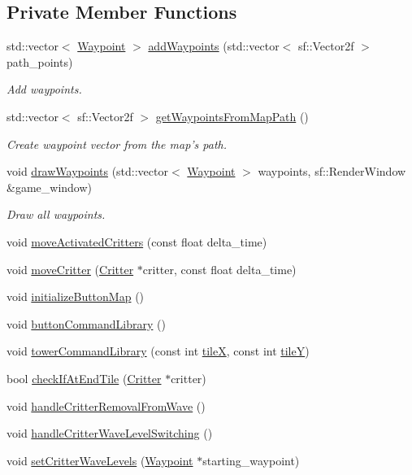 \subsection*{Private Member Functions}
\begin{DoxyCompactItemize}
\item 
std\+::vector$<$ \hyperlink{class_waypoint}{Waypoint} $>$ \hyperlink{class_game_state_play_aee1a80f02dd69d8f06c041020eb4447e}{add\+Waypoints} (std\+::vector$<$ sf\+::\+Vector2f $>$ path\+\_\+points)
\begin{DoxyCompactList}\small\item\em Add waypoints. \end{DoxyCompactList}\item 
std\+::vector$<$ sf\+::\+Vector2f $>$ \hyperlink{class_game_state_play_aae84ae33a68caa8bf05a4a2a49a2b41d}{get\+Waypoints\+From\+Map\+Path} ()
\begin{DoxyCompactList}\small\item\em Create waypoint vector from the map's path. \end{DoxyCompactList}\item 
void \hyperlink{class_game_state_play_a28fee46c0b9d0248ed319976be94494a}{draw\+Waypoints} (std\+::vector$<$ \hyperlink{class_waypoint}{Waypoint} $>$ waypoints, sf\+::\+Render\+Window \&game\+\_\+window)
\begin{DoxyCompactList}\small\item\em Draw all waypoints. \end{DoxyCompactList}\item 
void \hyperlink{class_game_state_play_ae812a7447027abe5fcc2f79bf3e35ad8}{move\+Activated\+Critters} (const float delta\+\_\+time)
\item 
void \hyperlink{class_game_state_play_a0d6ff2e65992c5fb29f180c6b1eb9435}{move\+Critter} (\hyperlink{class_critter}{Critter} $\ast$critter, const float delta\+\_\+time)
\item 
void \hyperlink{class_game_state_play_a3a6947bfe8be3d1974094acb8362eda9}{initialize\+Button\+Map} ()
\item 
void \hyperlink{class_game_state_play_a79237473ceeb26b94f641d0bf66c1ec0}{button\+Command\+Library} ()
\item 
void \hyperlink{class_game_state_play_ab33de76aa28534d14aa1d79bed43aa17}{tower\+Command\+Library} (const int \hyperlink{class_game_state_play_a6c82bd77433f30b20a88e19ab37a7f96}{tile\+X}, const int \hyperlink{class_game_state_play_ae34c6aa315832bd457df59720345534e}{tile\+Y})
\item 
bool \hyperlink{class_game_state_play_ac82134049ed6dd0aaa929e200f7185d5}{check\+If\+At\+End\+Tile} (\hyperlink{class_critter}{Critter} $\ast$critter)
\item 
void \hyperlink{class_game_state_play_a2278751d53b50beb97c809db26f1b9b6}{handle\+Critter\+Removal\+From\+Wave} ()
\item 
void \hyperlink{class_game_state_play_a2eda31c4d98a8440c6eba38604aa2a79}{handle\+Critter\+Wave\+Level\+Switching} ()
\item 
void \hyperlink{class_game_state_play_a6047cbdce7daa2092d95bf786db5267a}{set\+Critter\+Wave\+Levels} (\hyperlink{class_waypoint}{Waypoint} $\ast$starting\+\_\+waypoint)
\end{DoxyCompactItemize}
